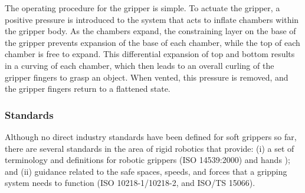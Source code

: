 \documentclass[letterpaper, 10 pt, conference]{ieeeconf}  %
\begin{document}
	The operating procedure for the gripper is simple. To actuate the gripper, a positive pressure is introduced to the system that acts to inflate chambers within the gripper body. As the chambers expand, the constraining layer on the base of the gripper prevents expansion of the base of each chamber, while the top of each chamber is free to expand. This differential expansion of top and bottom results in a curving of each chamber, which then leads to an overall curling of the gripper fingers to grasp an object. When vented, this pressure is removed, and the gripper fingers return to a flattened state. 
	
	\subsubsection{Standards} %
	Although no direct industry standards have been defined for soft grippers so far, there are several standards in the area of rigid robotics that provide: (i) a set of terminology and definitions for robotic grippers (ISO 14539:2000) and hands \cite{Falco2018}); and (ii) guidance related to the safe spaces, speeds, and forces that a gripping system needs to function (ISO 10218-1/10218-2, and ISO/TS 15066). %
	
\end{document}
